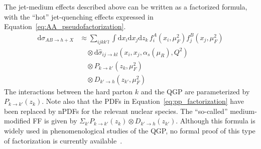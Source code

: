 The jet-medium effects described above can be written as a factorized formula, with the ``hot'' jet-quenching effects expressed in Equation~\ref{eq:AA_pseudofactorization}.
\begin{equation}
    \label{eq:AA_pseudofactorization}
    \begin{aligned}
        \mathrm{d}\sigma_{AB\rightarrow h+X}
        &\approx \sum_{ijkk'l}\int\mathrm{d}x_i\mathrm{d}x_j\mathrm{d}z_k\,
        f_i^A\left(x_i,\mu_F^2\right)f_j^B\left(x_j,\mu_F^2\right) \\
        &\quad\otimes \mathrm{d}\hat{\sigma}_{ij\rightarrow kl}\left(x_i,x_j, \alpha_s \left(\mu_R\right),Q^2 \right) \\
        &\quad\otimes P_{k\rightarrow k'}\left(z_{k},\mu_F^2\right) \\
        &\quad\otimes D_{k'\rightarrow h}\left(z_{k'},\mu_F^2\right)
    \end{aligned}
\end{equation}
The interactions between the hard parton $k$ and the QGP are parameterized by $P_{k\rightarrow k'}\left(z_{k}\right)$.
Note also that the PDFs in Equation~\ref{eq:pp_factorization} have been replaced by nPDFs for the relevant nuclear species.
The ``so-called'' medium-modified FF is given by $\Sigma_{k'} P_{k\rightarrow k'}\left(z_{k}\right)\otimes D_{k'\rightarrow h}\left(z_{k'}\right)$.
Although this formula is widely used in phenomenological studies of the QGP, no formal proof of this type of factorization is currently available~\cite{QGP:JetQuenching}.

